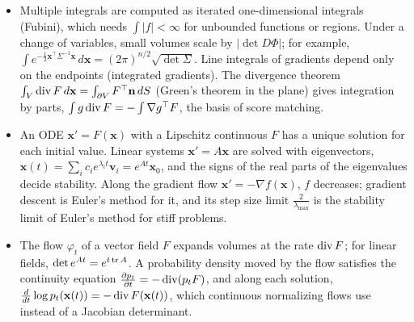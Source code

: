 \begin{itemize}[leftmargin=*]
    \item Multiple integrals are computed as iterated one-dimensional integrals (Fubini), which needs $\int |f| < \infty$ for unbounded functions or regions. Under a change of variables, small volumes scale by $|\det D\Phi|$; for example, $\int e^{-\frac{1}{2}\mathbf{x}^\top\Sigma^{-1}\mathbf{x}}\, d\mathbf{x} = (2\pi)^{n/2}\sqrt{\det\Sigma}$. Line integrals of gradients depend only on the endpoints (integrated gradients). The divergence theorem $\int_V \operatorname{div} F\, d\mathbf{x} = \int_{\partial V} F^\top\mathbf{n}\, dS$ (Green's theorem in the plane) gives integration by parts, $\int g\operatorname{div} F = -\int \nabla g^\top F$, the basis of score matching.
    \item An ODE $\mathbf{x}' = F(\mathbf{x})$ with a Lipschitz continuous $F$ has a unique solution for each initial value. Linear systems $\mathbf{x}' = A\mathbf{x}$ are solved with eigenvectors, $\mathbf{x}(t) = \sum_i c_ie^{\lambda_i t}\mathbf{v}_i = e^{At}\mathbf{x}_0$, and the signs of the real parts of the eigenvalues decide stability. Along the gradient flow $\mathbf{x}' = -\nabla f(\mathbf{x})$, $f$ decreases; gradient descent is Euler's method for it, and its step size limit $\frac{2}{\lambda_{\max}}$ is the stability limit of Euler's method for stiff problems.
    \item The flow $\varphi_t$ of a vector field $F$ expands volumes at the rate $\operatorname{div} F$; for linear fields, $\det e^{At} = e^{t\operatorname{tr} A}$. A probability density moved by the flow satisfies the continuity equation $\frac{\partial p_t}{\partial t} = -\operatorname{div}(p_tF)$, and along each solution, $\frac{d}{dt}\log p_t(\mathbf{x}(t)) = -\operatorname{div} F(\mathbf{x}(t))$, which continuous normalizing flows use instead of a Jacobian determinant.
\end{itemize}


